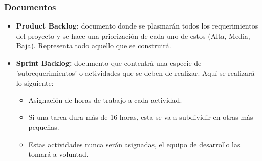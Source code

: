 \subsubsection{Documentos}
\begin{itemize}
	\item \textbf{Product Backlog: }documento donde se plasmarán todos los requerimientos del proyecto y se hace una priorización de cada uno de estos (Alta, Media, Baja). Representa todo aquello que se construirá. 
	\item \textbf{Sprint Backlog: } documento que contentrá una especie de 'subrequerimientos' o actividades que se deben de realizar. Aquí se realizará lo siguiente: 
	\begin{itemize}
		\item Asignación de horas de trabajo a cada actividad.
		\item Si una tarea dura más de 16 horas, esta se va a subdividir en otras más pequeñas. 
		\item Estas actividades nunca serán asignadas, el equipo de desarrollo las tomará a voluntad.
	\end{itemize} 
\end{itemize}
